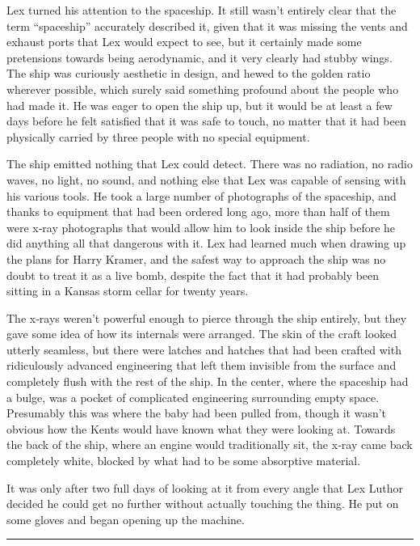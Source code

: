 \documentclass[ebook,12pt]{memoir}
\begin{document}
Lex turned his attention to the spaceship. It still wasn't entirely
clear that the term ``spaceship'' accurately described it, given that it
was missing the vents and exhaust ports that Lex would expect to see,
but it certainly made some pretensions towards being aerodynamic, and it
very clearly had stubby wings. The ship was curiously aesthetic in
design, and hewed to the golden ratio wherever possible, which surely
said something profound about the people who had made it. He was eager
to open the ship up, but it would be at least a few days before he felt
satisfied that it was safe to touch, no matter that it had been
physically carried by three people with no special equipment.

The ship emitted nothing that Lex could detect. There was no radiation,
no radio waves, no light, no sound, and nothing else that Lex was
capable of sensing with his various tools. He took a large number of
photographs of the spaceship, and thanks to equipment that had been
ordered long ago, more than half of them were x‐ray photographs that
would allow him to look inside the ship before he did anything all that
dangerous with it. Lex had learned much when drawing up the plans for
Harry Kramer, and the safest way to approach the ship was no doubt to
treat it as a live bomb, despite the fact that it had probably been
sitting in a Kansas storm cellar for twenty years.

The x‐rays weren't powerful enough to pierce through the ship entirely,
but they gave some idea of how its internals were arranged. The skin of
the craft looked utterly seamless, but there were latches and hatches
that had been crafted with ridiculously advanced engineering that left
them invisible from the surface and completely flush with the rest of
the ship. In the center, where the spaceship had a bulge, was a pocket
of complicated engineering surrounding empty space. Presumably this was
where the baby had been pulled from, though it wasn't obvious how the
Kents would have known what they were looking at. Towards the back of
the ship, where an engine would traditionally sit, the x‐ray came back
completely white, blocked by what had to be some absorptive material.

It was only after two full days of looking at it from every angle that
Lex Luthor decided he could get no further without actually touching the
thing. He put on some gloves and began opening up the machine.

\begin{center}\rule{0.5\linewidth}{\linethickness}\end{center}
\end{document}
